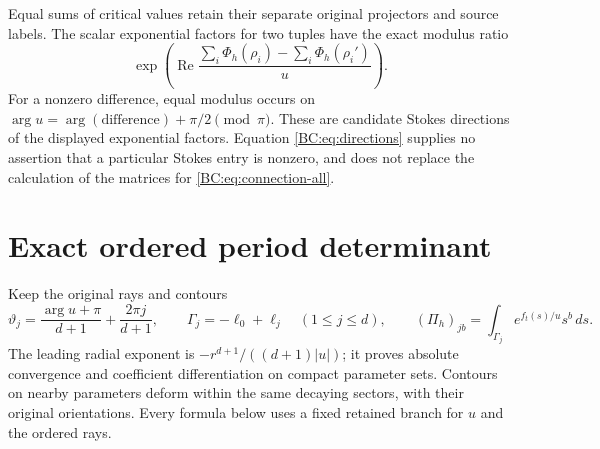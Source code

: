 Equal sums of critical values retain their separate original projectors
and source labels.  The scalar exponential factors for two tuples have
the exact modulus ratio
\begin{equation}
 \exp\!\left(\operatorname{Re}
      \frac{\sum_i\Phi_h(\rho_i)-\sum_i\Phi_h(\rho_i')}{u}\right).
 \label{BC:eq:directions}
\end{equation}
For a nonzero difference, equal modulus occurs on
$\arg u=\arg(\text{difference})+\pi/2\pmod\pi$.
These are candidate Stokes directions of the displayed exponential
factors.  Equation \eqref{BC:eq:directions} supplies no assertion that a
particular Stokes entry is nonzero, and does not replace the calculation
of the matrices for \eqref{BC:eq:connection-all}.

\section{Exact ordered period determinant}

Keep the original rays and contours
\begin{equation}
 \vartheta_j=\frac{\arg u+\pi}{d+1}+\frac{2\pi j}{d+1},
 \qquad \Gamma_j=-\ell_0+\ell_j\quad(1\le j\le d),
 \qquad
 (\Pi_h)_{jb}=\int_{\Gamma_j}e^{f_t(s)/u}s^b\,ds.
 \label{BC:eq:period}
\end{equation}
The leading radial exponent is
$-r^{d+1}/((d+1)|u|)$; it proves absolute convergence and
coefficient differentiation on compact parameter sets.  Contours on
nearby parameters deform within the same decaying sectors, with their
original orientations.  Every formula below uses a fixed retained
branch for $u$ and the ordered rays.

